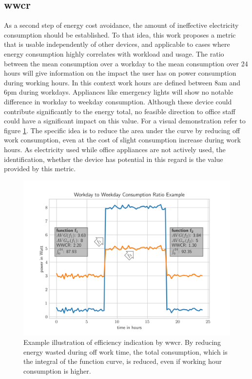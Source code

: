 \subsection{ \texorpdfstring{\acrfull{wwcr}}{WWCR}}\label{subsec:wwcr}
As a second step of energy cost avoidance, the amount of ineffective electricity consumption should be established. To that idea, this work proposes a metric that is usable independently of other devices, and applicable to cases where energy consumption highly correlates with workload and usage. The ratio between the mean consumption over a \gls{workday} to the mean consumption over 24 hours will give information on the impact the user has on power consumption during working hours. In this context work hours are defined between 8am and 6pm during \glspl{workday}. Appliances like emergency lights will show no notable difference in \gls{workday} to weekday consumption. Although these device could contribute significantly to the energy total, no feasible direction to office staff could have a significant impact on this value. For a visual demonstration refer to figure \ref{fig:wwcr}. The specific idea is to reduce the area under the curve by reducing off work consumption, even at the cost of slight consumption increase during work hours. As electricity used while office appliances are not actively used, the identification, whether the device has potential in this regard is the value provided by this metric.
\begin{figure}[ht]
	\includegraphics[width=\textwidth]{images/wwcr_plot.png}
	\caption{Example illustration of efficiency indication by \gls{wwcr}. By reducing energy wasted during off work time, the total consumption, which is the integral of the function curve, is reduced, even if working hour consumption is higher.}
	\label{fig:wwcr}
\end{figure}
